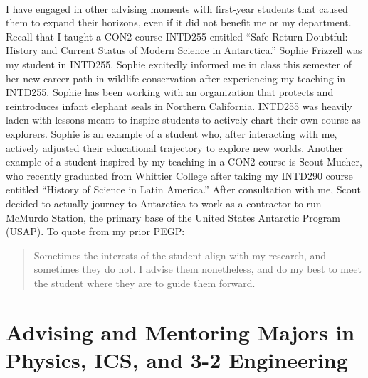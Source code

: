 \documentclass[../../main.tex]{subfiles}
\begin{document}
\\
\vspace{0.25cm}
I have engaged in other advising moments with first-year students that caused them to expand their horizons, even if it did not benefit me or my department.  Recall that I taught a CON2 course INTD255 entitled ``Safe Return Doubtful: History and Current Status of Modern Science in Antarctica.''  Sophie Frizzell was my student in INTD255.  Sophie excitedly informed me in class this semester of her new career path in wildlife conservation after experiencing my teaching in INTD255.  Sophie has been working with an organization that protects and reintroduces infant elephant seals in Northern California.  INTD255 was heavily laden with lessons meant to inspire students to actively chart their own course as explorers.  Sophie is an example of a student who, after interacting with me, actively adjusted their educational trajectory to explore new worlds.  Another example of a student inspired by my teaching in a CON2 course is Scout Mucher, who recently graduated from Whittier College after taking my INTD290 course entitled ``History of Science in Latin America.''  After consultation with me, Scout decided to actually journey to Antarctica to work as a contractor to run McMurdo Station, the primary base of the United States Antarctic Program (USAP).  To quote from my prior PEGP:

\begin{quotation}
Sometimes the interests of the student align with my research, and sometimes they do not. I advise them nonetheless, and do my best to meet the student where they are to guide them forward.
\end{quotation}

\section{Advising and Mentoring Majors in Physics, ICS, and 3-2 Engineering}
\end{document}
